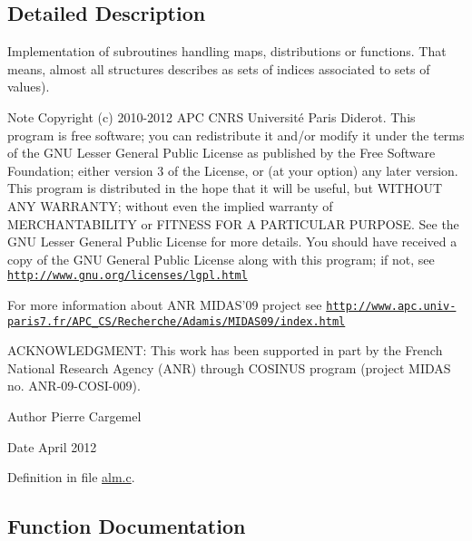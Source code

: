\subsection{Detailed Description}
Implementation of subroutines handling maps, distributions or functions. That means, almost all structures describes as sets of indices associated to sets of values). \begin{DoxyNote}{Note}
Copyright (c) 2010-\/2012 A\-P\-C C\-N\-R\-S Université Paris Diderot. This program is free software; you can redistribute it and/or modify it under the terms of the G\-N\-U Lesser General Public License as published by the Free Software Foundation; either version 3 of the License, or (at your option) any later version. This program is distributed in the hope that it will be useful, but W\-I\-T\-H\-O\-U\-T A\-N\-Y W\-A\-R\-R\-A\-N\-T\-Y; without even the implied warranty of M\-E\-R\-C\-H\-A\-N\-T\-A\-B\-I\-L\-I\-T\-Y or F\-I\-T\-N\-E\-S\-S F\-O\-R A P\-A\-R\-T\-I\-C\-U\-L\-A\-R P\-U\-R\-P\-O\-S\-E. See the G\-N\-U Lesser General Public License for more details. You should have received a copy of the G\-N\-U General Public License along with this program; if not, see \href{http://www.gnu.org/licenses/lgpl.html}{\tt http\-://www.\-gnu.\-org/licenses/lgpl.\-html} 

For more information about A\-N\-R M\-I\-D\-A\-S'09 project see \href{http://www.apc.univ-paris7.fr/APC_CS/Recherche/Adamis/MIDAS09/index.html}{\tt http\-://www.\-apc.\-univ-\/paris7.\-fr/\-A\-P\-C\-\_\-\-C\-S/\-Recherche/\-Adamis/\-M\-I\-D\-A\-S09/index.\-html} 

A\-C\-K\-N\-O\-W\-L\-E\-D\-G\-M\-E\-N\-T\-: This work has been supported in part by the French National Research Agency (A\-N\-R) through C\-O\-S\-I\-N\-U\-S program (project M\-I\-D\-A\-S no. A\-N\-R-\/09-\/\-C\-O\-S\-I-\/009). 
\end{DoxyNote}
\begin{DoxyAuthor}{Author}
Pierre Cargemel 
\end{DoxyAuthor}
\begin{DoxyDate}{Date}
April 2012 
\end{DoxyDate}


Definition in file \hyperlink{alm_8c_source}{alm.\-c}.



\subsection{Function Documentation}
